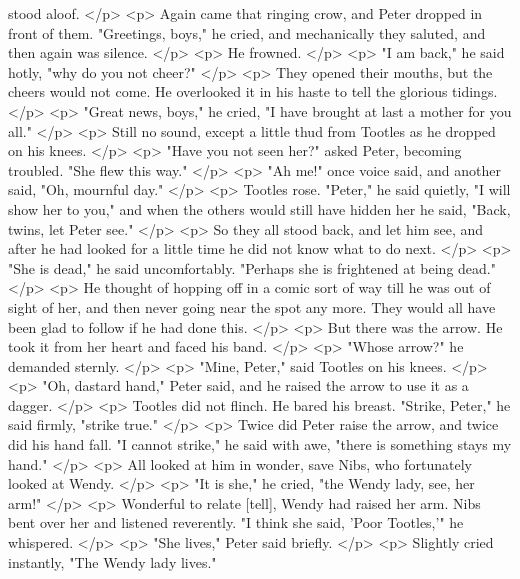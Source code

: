       stood aloof.
    </p>
    <p>
      Again came that ringing crow, and Peter dropped in front of them.
      "Greetings, boys," he cried, and mechanically they saluted, and then again
      was silence.
    </p>
    <p>
      He frowned.
    </p>
    <p>
      "I am back," he said hotly, "why do you not cheer?"
    </p>
    <p>
      They opened their mouths, but the cheers would not come. He overlooked it
      in his haste to tell the glorious tidings.
    </p>
    <p>
      "Great news, boys," he cried, "I have brought at last a mother for you
      all."
    </p>
    <p>
      Still no sound, except a little thud from Tootles as he dropped on his
      knees.
    </p>
    <p>
      "Have you not seen her?" asked Peter, becoming troubled. "She flew this
      way."
    </p>
    <p>
      "Ah me!" once voice said, and another said, "Oh, mournful day."
    </p>
    <p>
      Tootles rose. "Peter," he said quietly, "I will show her to you," and when
      the others would still have hidden her he said, "Back, twins, let Peter
      see."
    </p>
    <p>
      So they all stood back, and let him see, and after he had looked for a
      little time he did not know what to do next.
    </p>
    <p>
      "She is dead," he said uncomfortably. "Perhaps she is frightened at being
      dead."
    </p>
    <p>
      He thought of hopping off in a comic sort of way till he was out of sight
      of her, and then never going near the spot any more. They would all have
      been glad to follow if he had done this.
    </p>
    <p>
      But there was the arrow. He took it from her heart and faced his band.
    </p>
    <p>
      "Whose arrow?" he demanded sternly.
    </p>
    <p>
      "Mine, Peter," said Tootles on his knees.
    </p>
    <p>
      "Oh, dastard hand," Peter said, and he raised the arrow to use it as a
      dagger.
    </p>
    <p>
      Tootles did not flinch. He bared his breast. "Strike, Peter," he said
      firmly, "strike true."
    </p>
    <p>
      Twice did Peter raise the arrow, and twice did his hand fall. "I cannot
      strike," he said with awe, "there is something stays my hand."
    </p>
    <p>
      All looked at him in wonder, save Nibs, who fortunately looked at Wendy.
    </p>
    <p>
      "It is she," he cried, "the Wendy lady, see, her arm!"
    </p>
    <p>
      Wonderful to relate [tell], Wendy had raised her arm. Nibs bent over her
      and listened reverently. "I think she said, 'Poor Tootles,'" he whispered.
    </p>
    <p>
      "She lives," Peter said briefly.
    </p>
    <p>
      Slightly cried instantly, "The Wendy lady lives."
